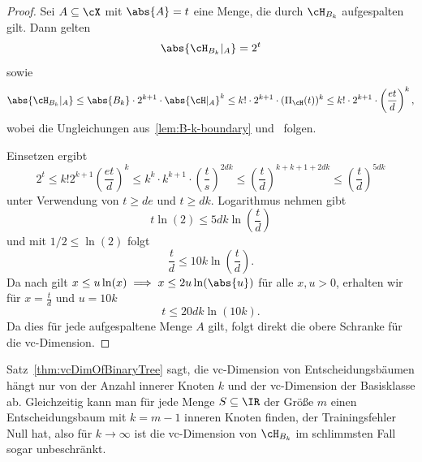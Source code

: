 \documentclass[language=ngerman,algolist,acrolist]{TemplateLecture}
\begin{document}
\begin{proof}
    Sei $A\subseteq \cX$ mit $\abs{A} = t$ eine Menge, die durch $\cH_{B_k}$ aufgespalten gilt. Dann gelten 
    \begin{equation}
        \abs{\cH_{B_k}|_A} = 2^t 
    \end{equation}
    sowie 
    \begin{equation}
        \abs{\cH_{B_k}|_A} \leq \abs{B_k} \cdot 2^{k + 1} \cdot \abs{\cH|_A}^k \leq k! \cdot 2^{k + 1} \cdot (\Pi_\cH(t))^k \leq k! \cdot 2^{k + 1} \cdot \left( \frac{et}{d} \right)^k,
    \end{equation}
    wobei die Ungleichungen aus~\cref{lem:B-k-boundary} und~ folgen.

    Einsetzen ergibt
    \begin{equation*}
        2^t \leq k! 2^{k+1} \left( \frac{et}{d} \right)^k \leq k^k \cdot k^{k+1} \cdot \left( \frac{t}{s} \right)^{2dk} \leq \left( \frac{t}{d} \right)^{k + k +1 + 2dk} \leq \left( \frac{t}{d} \right)^{5dk}
    \end{equation*}
    unter Verwendung von $t \geq de$ und $t \geq dk$. Logarithmus nehmen gibt 
    \begin{equation*}
        t\ln(2) \leq 5dk\ln\left( \frac{t}{d} \right)
    \end{equation*}
    und mit $1/2 \leq \ln(2)$ folgt 
    \begin{equation*}
        \frac{t}{d} \leq 10k\ln\left( \frac{t}{d} \right).
    \end{equation*}
    Da nach \textcolor{red}{} gilt $x \leq u\ln(x) \implies x \leq 2u\ln(\abs{u})$ für alle $x , u > 0$, erhalten wir für $x = \frac{t}{d}$ und $u = 10k$
    \begin{equation*}
        t \leq 20dk\ln(10k).
    \end{equation*}
    Da dies für jede aufgespaltene Menge $A$ gilt, folgt direkt die obere Schranke für die \ac{vc}-Dimension.
\end{proof}

Satz~\ref{thm:vcDimOfBinaryTree} sagt, die \ac{vc}-Dimension von Entscheidungsbäumen hängt nur von der Anzahl innerer Knoten $k$ und der \ac{vc}-Dimension der Basisklasse ab. Gleichzeitig kann man für jede Menge $S \subseteq \IR$ der Größe $m$ einen Entscheidungsbaum mit $k = m - 1$ inneren Knoten finden, der Trainingsfehler Null hat, also für $k \to \infty$ ist die \ac{vc}-Dimension von $\cH_{B_k}$ im schlimmsten Fall sogar unbeschränkt.
\end{document}
